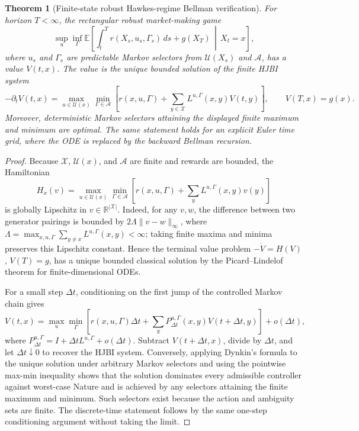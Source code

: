 \documentclass[11pt]{article}
\newtheorem{theorem}{Theorem}
\newcommand{\R}{\mathbb{R}}
\newcommand{\E}{\mathbb{E}}
\begin{document}
\begin{theorem}[Finite-state robust Hawkes-regime Bellman verification]
For horizon $T<\infty$, the rectangular robust market-making game
\[
\sup_{u}\inf_{\Gamma}\E\left[
\int_t^T r(X_s,u_s,\Gamma_s)\,ds+g(X_T)
\,\middle|\,X_t=x\right],
\]
where $u_s$ and $\Gamma_s$ are predictable Markov selectors from
$\mathcal U(X_s)$ and $\mathcal A$, has a value $V(t,x)$. The value is the
unique bounded solution of the finite HJBI system
\[
-\partial_t V(t,x)
=\max_{u\in\mathcal U(x)}\min_{\Gamma\in\mathcal A}
\left[
r(x,u,\Gamma)+
\sum_{y\in\mathcal X}L^{u,\Gamma}(x,y)V(t,y)
\right],
\qquad
V(T,x)=g(x).
\]
Moreover, deterministic Markov selectors attaining the displayed finite
maximum and minimum are optimal. The same statement holds for an explicit
Euler time grid, where the ODE is replaced by the backward Bellman recursion.
\end{theorem}

\begin{proof}
Because $\mathcal X$, $\mathcal U(x)$, and $\mathcal A$ are finite and rewards
are bounded, the Hamiltonian
\[
H_x(v)=\max_{u\in\mathcal U(x)}\min_{\Gamma\in\mathcal A}
\left[r(x,u,\Gamma)+\sum_y L^{u,\Gamma}(x,y)v(y)\right]
\]
is globally Lipschitz in $v\in\R^{|\mathcal X|}$. Indeed, for any $v,w$,
the difference between two generator pairings is bounded by
$2\Lambda\|v-w\|_\infty$, where
$\Lambda=\max_{x,u,\Gamma}\sum_{y\ne x}L^{u,\Gamma}(x,y)<\infty$; taking
finite maxima and minima preserves this Lipschitz constant. Hence the terminal
value problem $-\dot V=H(V)$, $V(T)=g$, has a unique bounded classical solution
by the Picard--Lindelof theorem for finite-dimensional ODEs.

For a small step $\Delta t$, conditioning on the first jump of the controlled
Markov chain gives
\[
V(t,x)=
\max_u\min_\Gamma
\left[
r(x,u,\Gamma)\Delta t+
\sum_y P_{\Delta t}^{u,\Gamma}(x,y)V(t+\Delta t,y)
\right]+o(\Delta t),
\]
where $P_{\Delta t}^{u,\Gamma}=I+\Delta t L^{u,\Gamma}+o(\Delta t)$. Subtract
$V(t+\Delta t,x)$, divide by $\Delta t$, and let $\Delta t\downarrow0$ to
recover the HJBI system. Conversely, applying Dynkin's formula to the unique
solution under arbitrary Markov selectors and using the pointwise
max-min inequality shows that the solution dominates every admissible
controller against worst-case Nature and is achieved by any selectors attaining
the finite maximum and minimum. Such selectors exist because the action and
ambiguity sets are finite. The discrete-time statement follows by the same
one-step conditioning argument without taking the limit.
\end{proof}
\end{document}
